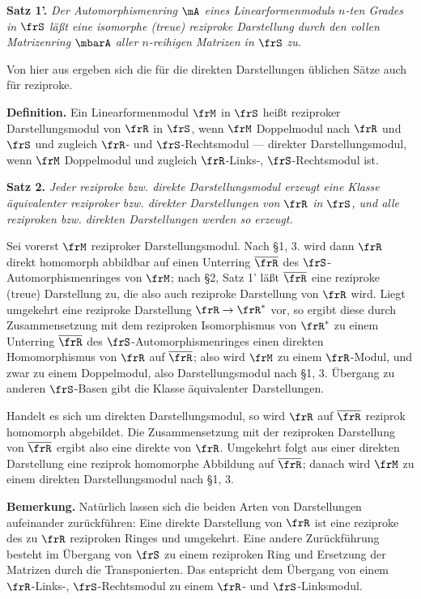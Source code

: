 \noindent\textbf{Satz 1'.} \emph{Der Automorphismenring \(\mA\) eines Linearformenmoduls \(n\)-ten Grades in \(\frS\) läßt eine isomorphe (treue) reziproke Darstellung durch den vollen Matrizenring \(\mbarA\) aller \(n\)-reihigen Matrizen in \(\frS\) zu.}

Von hier aus ergeben sich die für die direkten Darstellungen üblichen Sätze auch für reziproke.

\noindent\textbf{Definition.} Ein Linearformenmodul \(\frM\) in \(\frS\) heißt reziproker Darstellungsmodul von \(\frR\) in \(\frS\), wenn \(\frM\) Doppelmodul nach \(\frR\) und \(\frS\) und zugleich \(\frR\)- und \(\frS\)-Rechtsmodul --- direkter Darstellungsmodul, wenn \(\frM\) Doppelmodul und zugleich \(\frR\)-Links-, \(\frS\)-Rechtsmodul ist.

\noindent\textbf{Satz 2.} \emph{Jeder reziproke bzw. direkte Darstellungsmodul erzeugt eine Klasse äquivalenter reziproker bzw. direkter Darstellungen von \(\frR\) in \(\frS\), und alle reziproken bzw. direkten Darstellungen werden so erzeugt.}

Sei vorerst \(\frM\) reziproker Darstellungsmodul. Nach §1, 3. wird dann \(\frR\) direkt homomorph abbildbar auf einen Unterring \(\overline{\frR}\) des \(\frS\)-Automorphismenringes von \(\frM\); nach §2, Satz 1' läßt \(\overline{\frR}\) eine reziproke (treue) Darstellung zu, die also auch reziproke Darstellung von \(\frR\) wird. Liegt umgekehrt eine reziproke Darstellung \(\frR\to\frR^*\) vor, so ergibt diese durch Zusammensetzung mit dem reziproken Isomorphismus von \(\frR^*\) zu einem Unterring \(\overline{\frR}\) des \(\frS\)-Automorphismenringes einen direkten Homomorphismus von \(\frR\) auf \(\overline{\frR}\); also wird \(\frM\) zu einem \(\frR\)-Modul, und zwar zu einem Doppelmodul, also Darstellungsmodul nach §1, 3. Übergang zu anderen \(\frS\)-Basen gibt die Klasse äquivalenter Darstellungen.

Handelt es sich um direkten Darstellungsmodul, so wird \(\frR\) auf \(\overline{\frR}\) reziprok homomorph abgebildet. Die Zusammensetzung mit der reziproken Darstellung von \(\overline{\frR}\) ergibt also eine direkte von \(\frR\). Umgekehrt folgt aus einer direkten Darstellung eine reziprok homomorphe Abbildung auf \(\overline{\frR}\); danach wird \(\frM\) zu einem direkten Darstellungsmodul nach §1, 3.

\noindent\textbf{Bemerkung.} Natürlich lassen sich die beiden Arten von Darstellungen aufeinander zurückführen: Eine direkte Darstellung von \(\frR\) ist eine reziproke des zu \(\frR\) reziproken Ringes und umgekehrt. Eine andere Zurückführung besteht im Übergang von \(\frS\) zu einem reziproken Ring und Ersetzung der Matrizen durch die Transponierten. Das entspricht dem Übergang von einem \(\frR\)-Links-, \(\frS\)-Rechtsmodul zu einem \(\frR\)- und \(\frS\)-Linksmodul.

